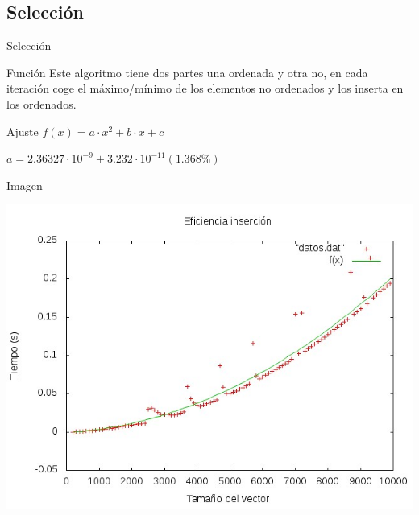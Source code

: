 \documentclass[compress]{beamer}
\begin{document}
\subsection{Selección}
\begin{frame}{Selección}
	\begin{block}{Función}
		Este algoritmo tiene dos partes una ordenada y otra no, en cada iteración coge el 			máximo/mínimo de los elementos no ordenados y los inserta en los ordenados.
	\end{block}
	
	\begin{block}{Ajuste}
	$f(x) = a\cdot x^2 + b\cdot x + c$
	
	$ a               = 2.36327\cdot 10^{-9}      \pm 3.232\cdot 10^{-11}    (1.368\%) $
	\end{block}
\end{frame}

\begin{frame}
	\begin{alertblock}{Imagen}
	\begin{center}
	\includegraphics[scale=0.55]{../Graficas/Seleccion/seleccionO0_ruben.jpeg}					\end{center}
	\end{alertblock}
\end{frame}



\end{document}
